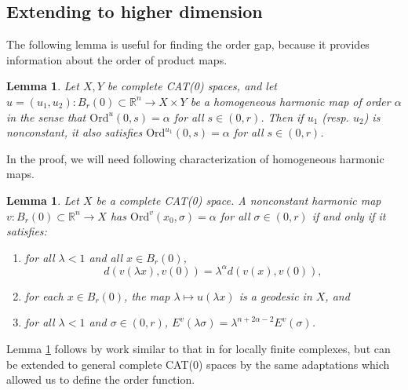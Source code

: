 \documentclass[12pt]{amsart}
\newtheorem{lemma}[theorem]{Lemma}
\theoremstyle{definition}
\numberwithin{equation}{section}
\newcommand{\R}{\mathbb R}
\begin{document}
\subsection{Extending to higher dimension}
\label{sec:essreg}

The following lemma is useful for finding the order gap, because it provides information about the order of product maps.
\begin{lemma}\label{lem:homord}
Let $X,Y$ be complete CAT(0) spaces, and let $u=(u_1,u_2)\colon B_r(0)\subset\R^n\to X\times Y$ be a homogeneous harmonic map of order $\alpha$ in the sense that $\text{Ord}^u(0,s)=\alpha$ for all $s\in(0,r)$.  Then if $u_1$ (resp. $u_2$) is nonconstant, it also satisfies $\text{Ord}^{u_1}(0,s)=\alpha$ for all $s\in(0,r)$.
\end{lemma}

In the proof, we will need following characterization of homogeneous harmonic maps.

\begin{lemma}\label{lem:homchar}
Let $X$ be a complete CAT(0) space.  A nonconstant harmonic map $v:{B_r(0)} \subset \R^n \to X$ has $\text{Ord}^v(x_0,\sigma)= \alpha$ for all $\sigma \in (0,r)$ if and only if it satisfies:
 \begin{enumerate}
 \item for all $\lambda<1$ and all $x\in B_r(0)$,
 \[
 d(v(\lambda x),v(0))=\lambda^\alpha d(v(x),v(0)),
 \]
 \item for each $x\in B_r(0)$, the map $\lambda\mapsto u(\lambda x)$ is a geodesic in $X$, and
 \item for all $\lambda<1$ and $\sigma\in(0,r)$, $E^v(\lambda \sigma)=\lambda^{n+2\alpha-2}E^v(\sigma)$.
 \end{enumerate}
\end{lemma}

Lemma \ref{lem:homchar} follows by work similar to that in \cite[Section 2]{gromov-schoen} for locally finite complexes, but can be extended to general complete CAT(0) spaces by the same adaptations which allowed us to define the order function.
\end{document}
